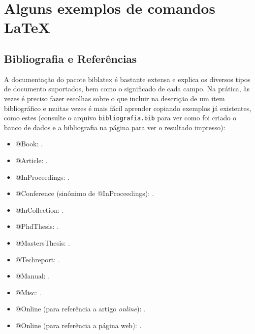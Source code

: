 \chapter{Alguns exemplos de comandos \LaTeX{}}

\section{Bibliografia e Referências}

A documentação do pacote biblatex é bastante extensa e explica
os diversos tipos de documento suportados, bem como o significado
de cada campo. Na prática, às vezes é preciso fazer escolhas sobre
o que incluir na descrição de um item bibliográfico e muitas vezes
é mais fácil aprender copiando exemplos já existentes, como estes (consulte o
arquivo \texttt{bibliografia.bib} para ver como foi criado o banco de dados e a
bibliografia na página \pageref{bibliografia} para ver o resultado impresso):

\begin{multicols}{2}
  \begin{itemize}
    \item @Book: \cite{JW82}.

    \item @Article: \cite{MenaChalco08}.

    \item @InProceedings: \cite{alves03:simi}.

    \item @Conference (sinônimo de @InProceedings): \cite{bronevetsky02}.

    \item @InCollection: \cite{bobaoglu93:concepts}.

    \item @PhdThesis: \cite{garcia01:PhD}.

    \item @MastersThesis: \cite{schmidt03:MSc}.

    \item @Techreport: \cite{alvisi99:analysisCIC}.

    \item @Manual: \cite{CORBA:spec}.

    \item @Misc: \cite{gridftp}.

    \item @Online (para referência a artigo \emph{online}): \cite{fowler04:designDead}.

    \item @Online (para referência a página web): \cite{FSF:GNU-GPL}.
  \end{itemize}
\end{multicols}

